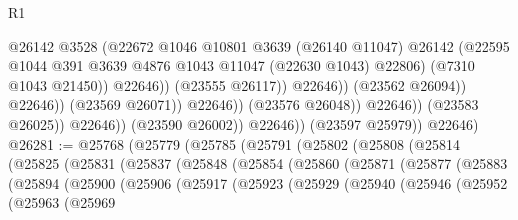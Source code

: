 \begin{lexlean}{R1}
\begin{coremodule}
                                                @26142
                                                @3528
                                                (@22672
                                                  @1046
                                                  @10801
                                                  @3639
                                                  (@26140 @11047)
                                                  @26142
                                                  (@22595
                                                    @1044
                                                    @391
                                                    @3639
                                                    @4876
                                                    @1043
                                                    @11047
                                                    (@22630 @1043)
                                                    @22806)
                                                  (@7310 @1043 @21450))
                                                @22646))
                                            (@23555 @26117))
                                          @22646))
                                      (@23562 @26094))
                                    @22646))
                                (@23569 @26071))
                              @22646))
                          (@23576 @26048))
                        @22646))
                    (@23583 @26025))
                  @22646))
              (@23590 @26002))
            @22646))
        (@23597 @25979))
      @22646)
@26281 := @25768
    (@25779
      (@25785
        (@25791
          (@25802
            (@25808
              (@25814
                (@25825
                  (@25831
                    (@25837
                      (@25848
                        (@25854
                          (@25860
                            (@25871
                              (@25877
                                (@25883
                                  (@25894
                                    (@25900
                                      (@25906
                                        (@25917
                                          (@25923
                                            (@25929
                                              (@25940
                                                (@25946
                                                  (@25952
                                                    (@25963
                                                      (@25969

\end{coremodule}
\end{lexlean}
